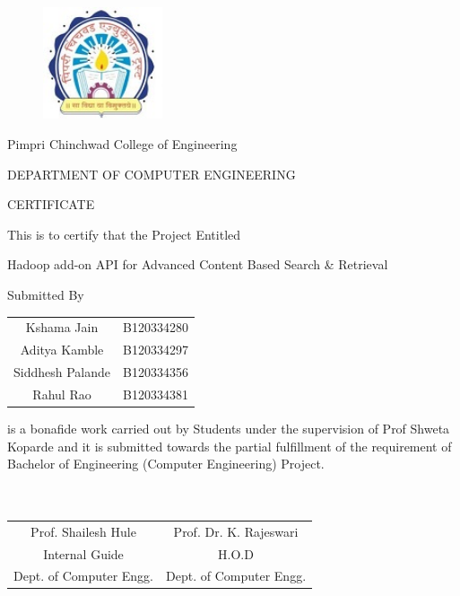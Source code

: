 \documentclass[oneside,a4paper,12pt]{report}
\begin{document}
\begin{figure}[ht]
\centering
\includegraphics[width=100pt]{image_pccoelogo.jpg}
\end{figure}


{\bfseries \fontsize{14}{12} \selectfont \centerline{Pimpri Chinchwad College of Engineering}
\centerline{DEPARTMENT OF COMPUTER ENGINEERING}
\vspace*{1\baselineskip}} 


{\bfseries \fontsize{16}{12} \selectfont \centerline{CERTIFICATE} 
\vspace*{1\baselineskip}} 

\centerline{This is to certify that the Project Entitled}
\vspace*{1\baselineskip} 


{\bfseries \fontsize{14}{12} \selectfont \centerline{Hadoop add-on API for Advanced Content Based Search \& Retrieval}
\vspace*{1\baselineskip}}


\begin{center}
Submitted By \\[4ex]
\begin{tabular}{cc}
Kshama Jain  & B120334280 \\
Aditya Kamble  & B120334297 \\
Siddhesh Palande  & B120334356 \\
Rahul Rao  & B120334381 \\[4ex]
\end{tabular}
\end{center}


is a bonafide work carried out by Students under the supervision of Prof Shweta Koparde and it
is submitted towards the partial fulfillment of the requirement of Bachelor of Engineering (Computer Engineering) Project.\\\\\\

\bgroup
\def\arraystretch{0.7}
\begin{tabular}{c c }
Prof. Shailesh Hule &  \hspace{50 mm} Prof. Dr. K. Rajeswari \\								
Internal Guide   &  \hspace{50 mm} H.O.D \\
Dept. of Computer Engg.  &	\hspace{50 mm}Dept. of Computer Engg.  \\
\end{tabular}
\end{document}
